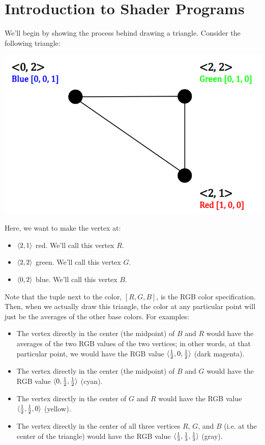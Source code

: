 \documentclass[letterpaper]{article}
\begin{document}
\section{Introduction to Shader Programs}
We'll begin by showing the process behind drawing a triangle. Consider the following triangle:
\begin{center}
    \includegraphics[scale=0.6]{../assets/shader1.png}
\end{center}
Here, we want to make the vertex at: 
\begin{itemize}
    \item $\langle 2, 1 \rangle$ red. We'll call this vertex $R$.
    \item $\langle 2, 2 \rangle$ green. We'll call this vertex $G$.
    \item $\langle 0, 2 \rangle$ blue. We'll call this vertex $B$. 
\end{itemize}
Note that the tuple next to the color, $[R, G, B]$, is the RGB color specification. Then, when we actually draw this triangle, the color at any particular point will just be the averages of the other base colors. For examples:
\begin{itemize}
    \item The vertex directly in the center (the midpoint) of $B$ and $R$ would have the averages of the two RGB values of the two vertices; in other words, at that particular point, we would have the RGB value $\langle \frac{1}{2}, 0, \frac{1}{2} \rangle$ (dark magenta).
    \item The vertex directly in the center (the midpoint) of $B$ and $G$ would have the RGB value $\langle 0, \frac{1}{2}, \frac{1}{2} \rangle$ (cyan).
    \item The vertex directly in the center of $G$ and $R$ would have the RGB value $\langle \frac{1}{2}, \frac{1}{2}, 0 \rangle$ (yellow). 
    \item The vertex directly in the center of all three vertices $R$, $G$, and $B$ (i.e. at the center of the triangle) would have the RGB value $\langle \frac{1}{3}, \frac{1}{3}, \frac{1}{3} \rangle$ (gray). 
\end{itemize}
\end{document}
